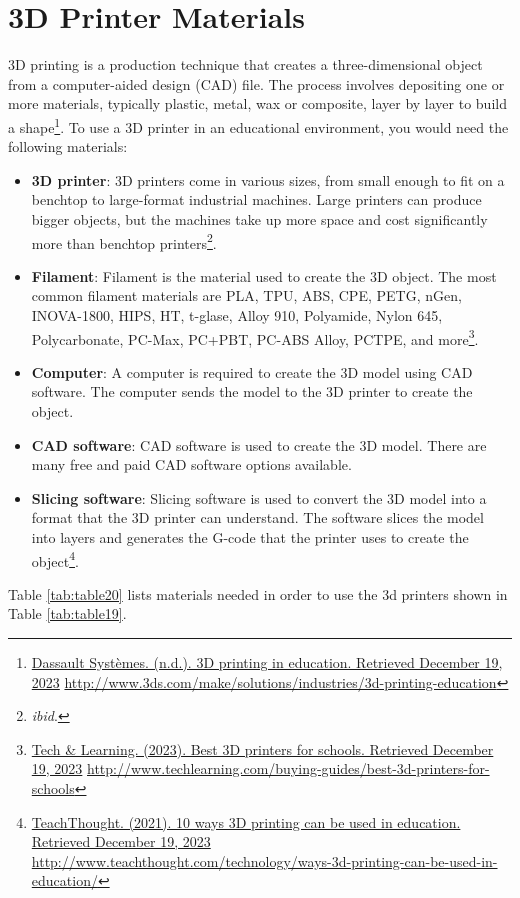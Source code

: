 \documentclass[12pt,letterpaper,twoside,openright]{report}
\begin{document}
\pagebreak
\hypertarget{d-printer-materials}{}\section{3D Printer Materials}\label{d-printer-materials}
3D printing is a production technique that creates a three-dimensional object from a computer-aided design (CAD) file. The process involves depositing one or more materials, typically plastic, metal, wax or composite, layer by layer to build a shape\footnote{\raggedright \href{http://www.3ds.com/make/solutions/industries/3d-printing-education}{Dassault Systèmes. (n.d.). 3D printing in education. Retrieved December 19, 2023} \url{http://www.3ds.com/make/solutions/industries/3d-printing-education}}. To use a 3D printer in an educational environment, you would need the following materials:

\begin{itemize}[leftmargin=*]
\item \textbf{3D printer}: 3D printers come in various sizes, from small enough to fit on a benchtop to large-format industrial machines. Large printers can produce bigger objects, but the machines take up more space and cost significantly more than benchtop printers\footnote{\raggedright \textit{ibid}.}.
\item \textbf{Filament}: Filament is the material used to create the 3D object. The most common filament materials are PLA, TPU, ABS, CPE, PETG, nGen, INOVA-1800, HIPS, HT, t-glase, Alloy 910, Polyamide, Nylon 645, Polycarbonate, PC-Max, PC+PBT, PC-ABS Alloy, PCTPE, and more\footnote{\raggedright \href{http://www.techlearning.com/buying-guides/best-3d-printers-for-schools}{Tech \& Learning. (2023). Best 3D printers for schools. Retrieved December 19, 2023} \url{http://www.techlearning.com/buying-guides/best-3d-printers-for-schools}}.
\item \textbf{Computer}: A computer is required to create the 3D model using CAD software. The computer sends the model to the 3D printer to create the object.
\item \textbf{CAD software}: CAD software is used to create the 3D model. There are many free and paid CAD software options available.
\item \textbf{Slicing software}: Slicing software is used to convert the 3D model into a format that the 3D printer can understand. The software slices the model into layers and generates the G-code that the printer uses to create the object\footnote{\raggedright \href{http://www.teachthought.com/technology/ways-3d-printing-can-be-used-in-education/}{TeachThought. (2021). 10 ways 3D printing can be used in education. Retrieved December 19, 2023} \url{http://www.teachthought.com/technology/ways-3d-printing-can-be-used-in-education/}}.
\end{itemize}
Table \ref{tab:table20} lists materials needed in order to use the 3d printers shown in Table \ref{tab:table19}.
\end{document}
